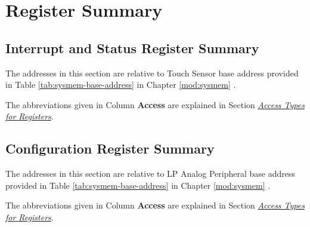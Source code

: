 \documentclass[main\_\_EN.tex]{subfiles}
\begin{document}



\newpage
\begin{landscape}
\hypertarget{tchsen-reg-summ}{}
\section{Register Summary}
\label{sec:tchsen-reg-summ}

\subsection{Interrupt and Status Register Summary}
\label{sec:tchsen-status-reg-summ}

The addresses in this section are relative to Touch Sensor base address provided in Table \ref{tab:sysmem-base-address} in Chapter \ref{mod:sysmem} \textit{}.

The abbreviations given in Column \textbf{Access} are explained in Section \hyperref[glossary-access-types]{\textit{Access Types for Registers}}.



\subsection{Configuration Register Summary}
\label{sec:tchsen-config-reg-summ}

The addresses in this section are relative to LP Analog Peripheral base address provided in Table \ref{tab:sysmem-base-address} in Chapter \ref{mod:sysmem} \textit{}.

The abbreviations given in Column \textbf{Access} are explained in Section \hyperref[glossary-access-types]{\textit{Access Types for Registers}}.


\end{landscape}



\end{document}
